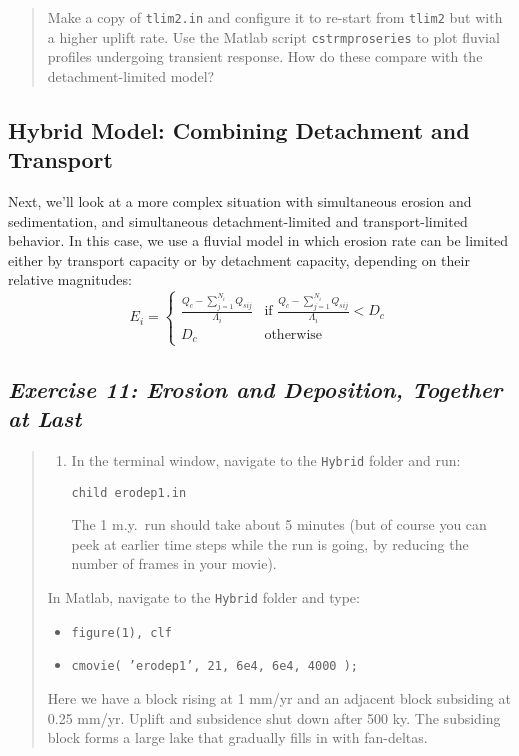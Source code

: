 \documentclass[12pt,reqno]{amsart}
\begin{document}
\begin{quote}
\small
{ Make a copy of {\tt tlim2.in} and
  configure it to re-start from {\tt tlim2} but with a higher uplift
  rate. Use the Matlab script {\tt cstrmproseries} to plot fluvial
  profiles undergoing transient response. How do these compare with
  the detachment-limited model?}
\end{quote}

\subsection{Hybrid Model: Combining Detachment and Transport}

Next, we'll look at a more complex situation with simultaneous erosion and sedimentation, and simultaneous detachment-limited and transport-limited behavior. In this case, we use a fluvial model in which erosion rate can be limited either by transport capacity or by detachment capacity, depending on their relative magnitudes:
\begin{equation}
E_i =
\begin{cases}
\frac{Q_c - \sum_{j=1}^{N_i} Q_{sij}}{\Lambda_i} & \text{if $\frac{Q_c - \sum_{j=1}^{N_i} Q_{sij}}{\Lambda_i} < D_c$} \\
D_c & \text{otherwise}
\end{cases}
\end{equation}

\subsection*{\em Exercise 11: Erosion and Deposition, Together at Last}

\begin{quote}
\small
{\sf
\begin{enumerate}
\item
In the terminal window, navigate to the {\tt Hybrid} folder and run:

{\tt child erodep1.in}

\noindent
The 1 m.y.\ run should take about 5 minutes (but of course you can
peek at earlier time steps while the run is going, by reducing the
number of frames in your movie).
\end{enumerate}

\noindent
In Matlab, navigate to the {\tt Hybrid} folder and type: 
\begin{itemize}
\setcounter{enumi}{1}
\item
{\tt figure(1), clf}
\item
{\tt cmovie( 'erodep1', 21, 6e4, 6e4, 4000 );}
\end{itemize}

\noindent
Here we have a block rising at 1 mm/yr and an adjacent block subsiding
at 0.25 mm/yr. Uplift and subsidence shut down after 500 ky. The
subsiding block forms a large lake that gradually fills in with
fan-deltas.
}
\end{quote}
\end{document}
